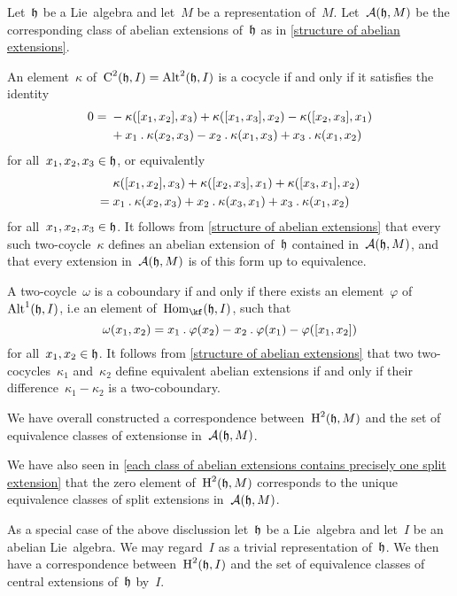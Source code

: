 \begin{fluff}
  Let~$\mathfrak{h}$ be a Lie~algebra and let~$M$ be a representation of~$M$.
  Let~$\mathcal{A}(\mathfrak{h}, M)$ be the corresponding class of abelian extensions of~$\mathfrak{h}$ as in \cref{structure of abelian extensions}.

  An element~$\kappa$ of~$\operatorname{C}^2(\mathfrak{h}, I) = \operatorname{Alt}^2(\mathfrak{h}, I)$ is a cocycle if and only if it satisfies the identity
  \begin{align*}
    0
    ={}&
    - \kappa([x_1, x_2], x_3)
    + \kappa([x_1, x_3], x_2)
    - \kappa([x_2, x_3], x_1)
    \\
    {}&
    + x_1 \mathbin{.} \kappa(x_2, x_3)
    - x_2 \mathbin{.} \kappa(x_1, x_3)
    + x_3 \mathbin{.} \kappa(x_1, x_2)
  \end{align*}
  for all~$x_1, x_2, x_3 \in \mathfrak{h}$, or equivalently
  \begin{align*}
    {}&
    \kappa([x_1, x_2], x_3)
    + \kappa([x_2, x_3], x_1)
    + \kappa([x_3, x_1], x_2)
    \\
    ={}&
    x_1 \mathbin{.} \kappa(x_2, x_3)
    + x_2 \mathbin{.} \kappa(x_3, x_1)
    + x_3 \mathbin{.} \kappa(x_1, x_2)
  \end{align*}
  for all~$x_1, x_2, x_3 \in \mathfrak{h}$.
  It follows from \cref{structure of abelian extensions} that every such two-coycle~$\kappa$ defines an abelian extension of~$\mathfrak{h}$ contained in~$\mathcal{A}(\mathfrak{h}, M)$, and that every extension in~$\mathcal{A}(\mathfrak{h}, M)$ is of this form up to equivalence.

  A two-coycle~$\omega$ is a coboundary if and only if there exists an element~$\varphi$ of~$\operatorname{Alt}^1(\mathfrak{h}, I)$, i.e an element of~$\Hom_{\kf}(\hlie, I)$, such that
  \[
    \omega(x_1, x_2)
    =
    x_1 \mathbin{.} \varphi(x_2)
    - x_2 \mathbin{.} \varphi(x_1)
    - \varphi( [x_1, x_2] )
  \]
  for all~$x_1, x_2 \in \mathfrak{h}$.
  It follows from \cref{structure of abelian extensions} that two two-cocycles~$\kappa_1$ and~$\kappa_2$ define equivalent abelian extensions if and only if their difference~$\kappa_1 - \kappa_2$ is a two-coboundary.

  We have overall constructed a {\onetoonetext} correspondence between~$\operatorname{H}^2(\mathfrak{h}, M)$ and the set of equivalence classes of extensionse in~$\mathcal{A}(\mathfrak{h}, M)$.

  We have also seen in \cref{each class of abelian extensions contains precisely one split extension} that the zero element of~$\operatorname{H}^2(\mathfrak{h}, M)$ corresponds to the unique equivalence classes of split extensions in~$\mathcal{A}(\mathfrak{h}, M)$.
\end{fluff}


\begin{fluff}
  As a special case of the above disclussion let~$\mathfrak{h}$ be a Lie~algebra and let~$I$ be an abelian Lie~algebra.
  We may regard~$I$ as a trivial representation of~$\mathfrak{h}$.
  We then have a {\onetoonetext} correspondence between~$\operatorname{H}^2(\mathfrak{h}, I)$ and the set of equivalence classes of central extensions of~$\mathfrak{h}$ by~$I$.
\end{fluff}





